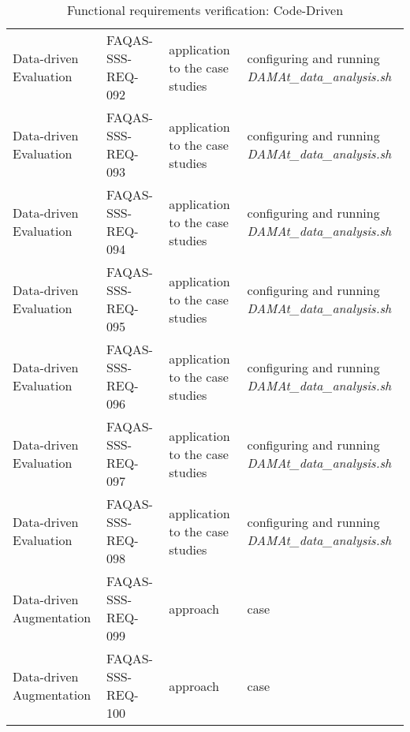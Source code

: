 \begin{table}[h!]
{\begin{tabular}{|l|l|l|l|}
Data-driven Evaluation & FAQAS-SSS-REQ-092 & application to the case studies & configuring and running \emph{DAMAt\_data\_analysis.sh} \\
Data-driven Evaluation & FAQAS-SSS-REQ-093 & application to the case studies & configuring and running \emph{DAMAt\_data\_analysis.sh} \\
Data-driven Evaluation & FAQAS-SSS-REQ-094 & application to the case studies & configuring and running \emph{DAMAt\_data\_analysis.sh} \\
Data-driven Evaluation & FAQAS-SSS-REQ-095 & application to the case studies & configuring and running \emph{DAMAt\_data\_analysis.sh} \\
Data-driven Evaluation & FAQAS-SSS-REQ-096 & application to the case studies & configuring and running \emph{DAMAt\_data\_analysis.sh} \\
Data-driven Evaluation & FAQAS-SSS-REQ-097 & application to the case studies & configuring and running \emph{DAMAt\_data\_analysis.sh} \\
Data-driven Evaluation & FAQAS-SSS-REQ-098 & application to the case studies & configuring and running \emph{DAMAt\_data\_analysis.sh} \\
Data-driven Augmentation & FAQAS-SSS-REQ-099 & approach & case \\
Data-driven Augmentation & FAQAS-SSS-REQ-100 & approach & case \\
\hline
\end{tabular}
  }
\caption{Functional requirements verification: Code-Driven}
\label{tables:data}
\end{table}
